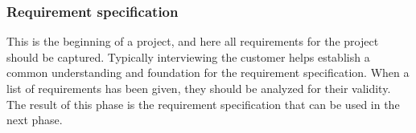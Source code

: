 \subsubsection{Requirement specification}

This is the beginning of a project, and here all requirements for the project should be 
captured\cite{waterfallexplained}. Typically interviewing the customer helps establish a 
common understanding and foundation for the requirement specification. When a list of 
requirements has been given, they should be analyzed for their 
validity\cite{waterfallexplained}. The result of this phase is the requirement specification 
that can be used in the next phase\cite{waterfallexplained}.